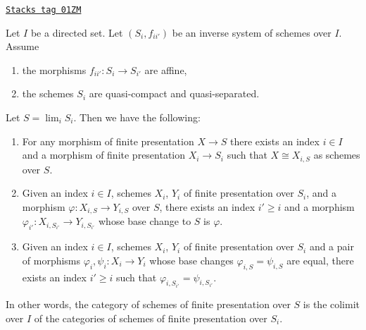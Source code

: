 \begin{lemma}
\label{limits-lemma-descend-finite-presentation}
\href{https://stacks.math.columbia.edu/tag/01ZM}{\texttt{Stacks tag 01ZM}}

Let $I$ be a directed set.
Let $(S_i, f_{ii'})$ be an inverse system of schemes over $I$.
Assume
\begin{enumerate}
\item the morphisms $f_{ii'} : S_i \to S_{i'}$ are affine,
\item the schemes $S_i$ are quasi-compact and quasi-separated.
\end{enumerate}
Let $S = \lim_i S_i$. Then we have the following:
\begin{enumerate}
\item For any morphism of finite presentation $X \to S$
there exists an index $i \in I$ and a morphism of finite
presentation $X_i \to S_i$ such that $X \cong X_{i, S}$ as
schemes over $S$.
\item Given an index $i \in I$, schemes
$X_i$, $Y_i$ of finite presentation over $S_i$, and a morphism
$\varphi : X_{i, S} \to Y_{i, S}$ over $S$, there exists an index
$i' \geq i$ and a morphism
$\varphi_{i'} : X_{i, S_{i'}} \to Y_{i, S_{i'}}$
whose base change to $S$ is $\varphi$.
\item Given an index $i \in I$, schemes $X_i$, $Y_i$ of finite presentation
over $S_i$ and a pair of morphisms $\varphi_i, \psi_i : X_i \to Y_i$
whose base changes $\varphi_{i, S} = \psi_{i, S}$ are equal,
there exists an index $i' \geq i$ such that
$\varphi_{i, S_{i'}} = \psi_{i, S_{i'}}$.
\end{enumerate}
In other words, the category of schemes of finite presentation over
$S$ is the colimit over $I$ of the categories of schemes of finite
presentation over $S_i$.
\end{lemma}


